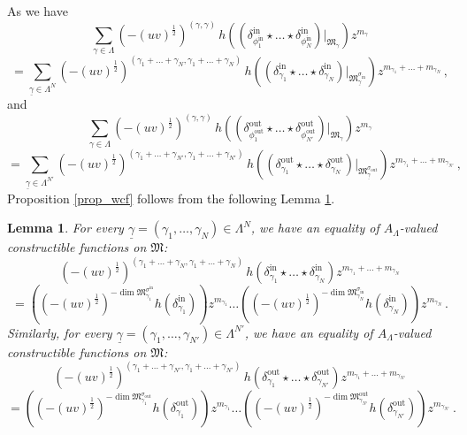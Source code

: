 \documentclass[12pt, a4paper]{amsart}
\newtheorem{lem}[defn]{Lemma}
\newcommand\fM{\mathfrak M}
\newcommand\iin{\mathrm{in}}
\newcommand\oout{\mathrm{out}}
\begin{document}
As we have  
\[ \sum_{\gamma \in \Lambda}
(-(uv)^{\frac{1}{2}})^{(\gamma,\gamma)}
\,h\left( (\delta_{\phi_1^{\iin}}^{\iin}
\star \dots \star \delta_{\phi_N^{\iin}}^{\iin})|_{\fM_\gamma}\right)z^{m_\gamma}\]
\[=\sum_{\underline{\gamma}
\in \Lambda^N}
(-(uv)^{\frac{1}{2}})^{(\gamma_1+\dots+
\gamma_N,\gamma_1+\dots+\gamma_N)}\,h\left( (\delta_{\gamma_1}^{\iin}
\star \dots \star \delta_{\gamma_N}^{\iin})|_{\fM_{\underline{\gamma}}^{\sigma_\iin}}\right)
z^{m_{\gamma_1}+\dots +m_{\gamma_N}}\,,\]
and 
\[ \sum_{\gamma \in \Lambda}
(-(uv)^{\frac{1}{2}})^{(\gamma,\gamma)}
\,h\left( (\delta_{\phi_1^{\oout}}^{\oout}
\star \dots \star \delta_{\phi_{N'}^{\oout}}^{\oout})|_{\fM_\gamma}\right)z^{m_\gamma}\]
\[=\sum_{\underline{\gamma}
\in \Lambda^{N'}}
(-(uv)^{\frac{1}{2}})^{(\gamma_1+\dots
+\gamma_{N'},\gamma_1+\dots+\gamma_{N'})}\,h\left( (\delta_{\gamma_1}^{\oout}
\star \dots \star \delta_{\gamma_N}^{\oout})|_{\fM_{\underline{\gamma}}^{\sigma_\oout}}\right)
z^{m_{\gamma_1}+\dots +m_{\gamma_{N'}}}\,,\]
Proposition \ref{prop_wcf} follows from the following Lemma \ref{lem_wcf}.

\begin{lem}\label{lem_wcf}
For every $\underline{\gamma}
=(\gamma_1,\dots,\gamma_N)
\in \Lambda^N$, we have an equality of $A_\Lambda$-valued constructible functions on 
$\fM$:
\[ (-(uv)^{\frac{1}{2}})^{
(\gamma_1+\dots+\gamma_N,
\gamma_1+\dots+\gamma_N)}\,h (\delta_{\gamma_1}^{\iin}
\star \dots \star \delta_{\gamma_N}^{\iin})
z^{m_{\gamma_1}+\dots +m_{\gamma_N}}\]
\[=\left((-(uv)^{\frac{1}{2}})^{-\dim \fM_{\gamma_1}^{\sigma^\iin}} h(\delta_{\gamma_1}^\iin)\right)
z^{m_{\gamma_1}}
\dots\left((-(uv)^{\frac{1}{2}})^{-\dim \fM_{\gamma_N}^{\sigma_\iin}} h(\delta_{\gamma_N}^\iin)\right)
z^{m_{\gamma_N}}\,.
\]
Similarly, for every $\underline{\gamma}
=(\gamma_1,\dots,\gamma_{N'})
\in \Lambda^{N'}$, we have an equality of $A_\Lambda$-valued constructible functions on 
$\fM$:
\[ (-(uv)^{\frac{1}{2}})^{(\gamma_1+\dots+\gamma_{N'},\gamma_1+\dots+\gamma_{N'})}\,
h(\delta_{\gamma_1}^{\oout}
\star \dots \star \delta_{\gamma_{N'}}^{\oout})
z^{m_{\gamma_1}+\dots +m_{\gamma_{N'}}}\]
\[=\left((-(uv)^{\frac{1}{2}})^{-\dim \fM_{\gamma_1}^{\sigma_\oout}} h(\delta_{\gamma_1}^\oout)\right)
z^{m_{\gamma_1}}
\dots \left((-(uv)^{\frac{1}{2}})^{-\dim\fM_{\gamma_{N'}}^\oout} h(\delta_{\gamma_{N'}}^\oout)\right)
z^{m_{\gamma_{N'}}}\,.
\]
\end{lem}
\end{document}
